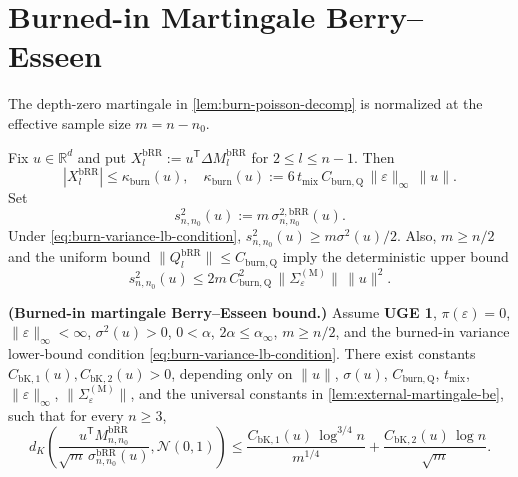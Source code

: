 
\section{Burned-in Martingale Berry--Esseen}

The depth-zero martingale in \cref{lem:burn-poisson-decomp} is normalized at the
effective sample size $m = n - n_{0}$.

Fix $u \in \mathbb{R}^{d}$ and put
$X_{l}^{\mathrm{bRR}} := u^{\mathsf{T}} \Delta M_{l}^{\mathrm{bRR}}$ for $2 \le l \le n - 1$. Then
\begin{equation}
|X_{l}^{\mathrm{bRR}}| \le \kappa_{\mathrm{burn}}(u),
\quad
\kappa_{\mathrm{burn}}(u)
  := 6 \, t_{\mathrm{mix}} \, C_{\mathrm{burn,Q}} \, \lVert \varepsilon \rVert_{\infty}
     \, \lVert u \rVert.
\label{eq:burn-M-incr}
\end{equation}
Set
\[
s_{n,n_{0}}^{2}(u) := m \, \sigma_{n,n_{0}}^{2, \mathrm{bRR}}(u).
\]
Under \eqref{eq:burn-variance-lb-condition},
$s_{n,n_{0}}^{2}(u) \ge m \sigma^{2}(u) / 2$. Also,
$m \ge n / 2$ and the uniform bound $\lVert Q_{l}^{\mathrm{bRR}} \rVert \le C_{\mathrm{burn,Q}}$
imply the deterministic upper bound
\begin{equation}
s_{n,n_{0}}^{2}(u)
  \le 2 m \, C_{\mathrm{burn,Q}}^{2} \,
     \lVert \Sigma_{\varepsilon}^{(\mathrm{M})} \rVert \, \lVert u \rVert^{2}.
\label{eq:burn-s-upper}
\end{equation}

\begin{theorem}\label{thm:burn-M-BE}
  \textbf{(Burned-in martingale Berry--Esseen bound.)}
  Assume \textbf{UGE 1}, $\pi(\varepsilon) = 0$,
  $\lVert \varepsilon \rVert_{\infty} < \infty$, $\sigma^{2}(u) > 0$,
  $0 < \alpha$, $2 \alpha \le \alpha_{\infty}$, $m \ge n / 2$, and the
  burned-in variance lower-bound condition \eqref{eq:burn-variance-lb-condition}.
  There exist constants $C_{\mathrm{bK,1}}(u), C_{\mathrm{bK,2}}(u) > 0$, depending only on
  $\lVert u \rVert$, $\sigma(u)$, $C_{\mathrm{burn,Q}}$, $t_{\mathrm{mix}}$,
  $\lVert \varepsilon \rVert_{\infty}$, $\lVert \Sigma_{\varepsilon}^{(\mathrm{M})} \rVert$, and the
  universal constants in \cref{lem:external-martingale-be}, such that for every
  $n \ge 3$,
  \begin{equation}
d_{K} \left( \frac{u^{\mathsf{T}} M_{n,n_{0}}^{\mathrm{bRR}}}{\sqrt{m} \, \sigma_{n,n_{0}}^{\mathrm{bRR}}(u)},
    \mathcal{N}(0, 1) \right)
    \le \frac{C_{\mathrm{bK,1}}(u) \, \log^{3 / 4} n}{m^{1 / 4}}
     + \frac{C_{\mathrm{bK,2}}(u) \, \log n}{\sqrt{m}}.
\label{eq:burn-M-BE}
\end{equation}
\end{theorem}


